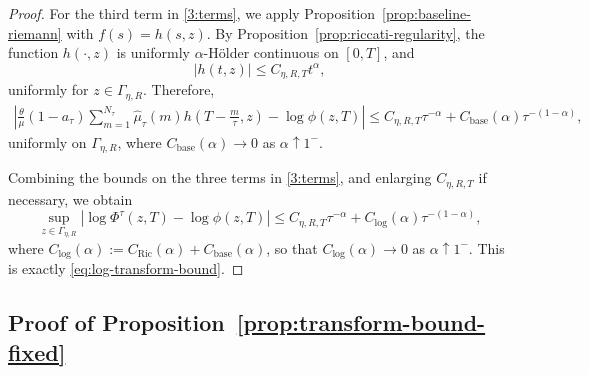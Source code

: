 \documentclass[letterpaper]{article}
\numberwithin{equation}{section}
\theoremstyle{definition}
\theoremstyle{remark}
\begin{document}
\begin{proof}
For the third term in \eqref{3:terms}, we apply Proposition~\ref{prop:baseline-riemann} with
$f(s)=h(s,z)$. By Proposition~\ref{prop:riccati-regularity}, the function $h(\cdot,z)$
is uniformly $\alpha$-H\"older continuous on $[0,T]$, and
\[
  |h(t,z)|\le C_{\eta,R,T}t^\alpha,
\]
uniformly for $z\in\Gamma_{\eta,R}$. Therefore,
\begin{align*}
  \left|
    \frac{\theta}{\mu}(1-a_\tau)
    \sum_{m=1}^{N_\tau}\hat\mu_\tau(m)
    h\!\left(T-\frac{m}{\tau},z\right)
    -
    \log\phi(z,T)
  \right|
  \le
  C_{\eta,R,T}\tau^{-\alpha}
  +
  C_{\mathrm{base}}(\alpha)\tau^{-(1-\alpha)},
\end{align*}
uniformly on $\Gamma_{\eta,R}$, where $C_{\mathrm{base}}(\alpha)\to0$ as $\alpha\uparrow1^-$.

Combining the bounds on the three terms in \eqref{3:terms}, and enlarging
$C_{\eta,R,T}$ if necessary, we obtain
\[
  \sup_{z\in\Gamma_{\eta,R}}
  \left|
    \log\Phi^\tau(z,T)-\log\phi(z,T)
  \right|
  \le
  C_{\eta,R,T}\tau^{-\alpha}
  +
  C_{\log}(\alpha)\tau^{-(1-\alpha)},
\]
where
$C_{\log}(\alpha):=C_{\mathrm{Ric}}(\alpha)+C_{\mathrm{base}}(\alpha)$,
so that
$C_{\log}(\alpha)\to0$
as $\alpha\uparrow1^-$.
This is exactly \eqref{eq:log-transform-bound}.
\end{proof}


\subsection{Proof of Proposition~\ref{prop:transform-bound-fixed}}\label{app:proof-transform-bound-fixed}
\end{document}
